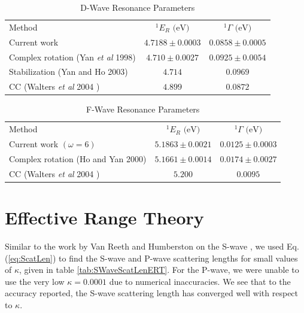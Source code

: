 \documentclass[preprint,showpacs,preprintnumbers,amsmath,amssymb]{revtex4}
\begin{document}
\begin{table}[H]
\begin{center}
\begin{ruledtabular}
\begin{tabular}{l c c}
Method & $^1E_R \text{ (eV)}$ & $^1\Gamma \text{ (eV)}$ \\
\colrule
Current work & $4.7188 \pm 0.0003$ & $0.0858 \pm 0.0005$ \\
Complex rotation (Yan \emph{et al} 1998) \cite{Ho1998} & $4.710 \pm 0.0027$ & $0.0925 \pm 0.0054$  \\
Stabilization (Yan and Ho 2003) \cite{Yan2003} & $4.714$ & $0.0969$ \\
CC (Walters \emph{et al} 2004 \cite{Walters2004}) & $4.899$ & $0.0872$ \\
\end{tabular}
\end{ruledtabular}
\caption{D-Wave Resonance Parameters} %
\label{tab:DWaveResonances}
\end{center}
\end{table}


\begin{table}[H]
\begin{center}
\begin{ruledtabular}
\begin{tabular}{l c c}
Method & $^1E_R \text{ (eV)}$ & $^1\Gamma \text{ (eV)}$ \\
\colrule
Current work $(\omega = 6)$ & $5.1863 \pm 0.0021$ & $0.0125 \pm 0.0003$ \\
Complex rotation (Ho and Yan 2000) \cite{Ho2000} & $5.1661 \pm 0.0014$ & $0.0174 \pm 0.0027$  \\
CC (Walters \emph{et al} 2004 \cite{Walters2004}) & $5.200$ & $0.0095$ \\
\end{tabular}
\end{ruledtabular}
\caption{F-Wave Resonance Parameters} %
\label{tab:FWaveResonances}
\end{center}
\end{table}



\section{Effective Range Theory}

Similar to the work by Van Reeth and Humberston on the S-wave \cite{VanReeth2003}, we used Eq. (\ref{eq:ScatLen}) to find the S-wave and P-wave scattering lengths for small values of $\kappa$, given in table \ref{tab:SWaveScatLenERT}. For the P-wave, we were unable to use the very low $\kappa = 0.0001$ due to numerical inaccuracies. We see that to the accuracy reported, the S-wave scattering length has converged well with respect to $\kappa$.
\end{document}
